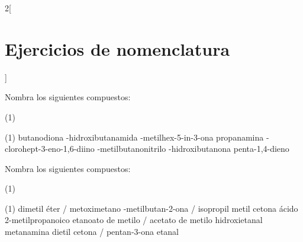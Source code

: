 \documentclass[10pt]{article}
\begin{document}
\begin{multicols}{2}[
  \section{Ejercicios de nomenclatura}
  ]
\begin{exercise}[
    tags    = {orgánica,formulación,múltiple,2B},
    topics  = {química orgánica,formulación,nomenclatura},
    source  = {Química 2B SAN 2016, p391, e15},
  ]
  Nombra los siguientes compuestos:

  \begin{tasks}(1)
    \task {}
    \task {}
    \task {}
    \task {}
    \task {}
    \task {}
    \task {}
    \task {}
  \end{tasks}
  \end{exercise}

  \begin{solution}
    \begin{tasks}(1)
      \task butanodiona
      -hidroxibutanamida
      -metilhex-5-in-3-ona
      \task propanamina
      -clorohept-3-eno-1,6-diino
      -metilbutanonitrilo
      -hidroxibutanona
      \task penta-1,4-dieno
    \end{tasks}
  \end{solution}


  \begin{exercise}[
      tags    = {orgánica,formulación,múltiple,2B},
      topics  = {química orgánica,formulación,nomenclatura},
      source  = {Química 2B SAN 2016, p391, e16},
    ]
    Nombra los siguientes compuestos:

  \begin{tasks}(1)
    \task {}
    \task {}
    \task {}
    \task {}
    \task {}
    \task {}
    \task {}
    \task {}
  \end{tasks}
\end{exercise}

\begin{solution}
  \begin{tasks}(1)
    \task dimetil éter / metoximetano
    -metilbutan-2-ona / isopropil metil cetona
    \task ácido 2-metilpropanoico
    \task etanoato de metilo / acetato de metilo
    \task hidroxietanal
    \task metanamina
    \task dietil cetona / pentan-3-ona
    \task etanal
  \end{tasks}
\end{solution}

\end{multicols}
\end{document}
